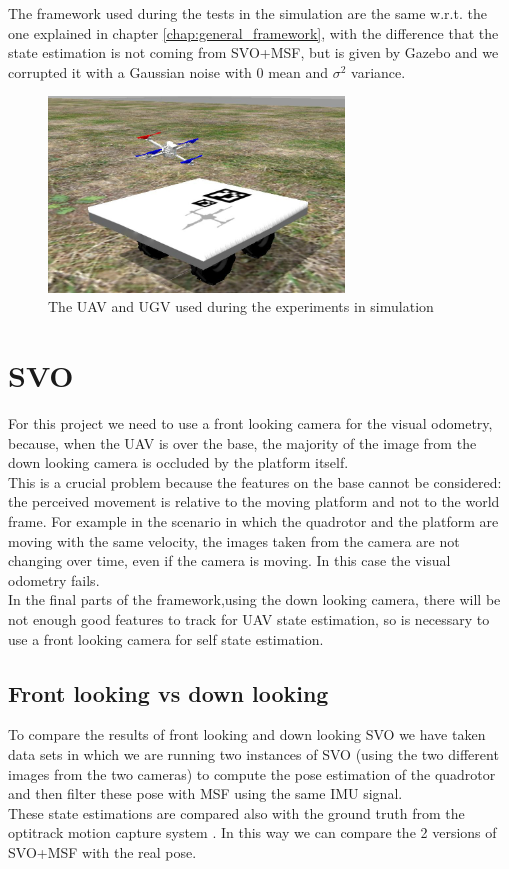 The framework used during the tests in the simulation are the same w.r.t. the one explained in chapter \ref{chap:general_framework}, with the difference that the state estimation is not coming from SVO+MSF, but is given by Gazebo and we corrupted it with a Gaussian noise with 0 mean and $\sigma^2$ variance.

\begin{figure}[!ht]
    \centering
    \includegraphics[width=0.7\textwidth]{img/simulation.jpg}
    \caption{The UAV and UGV used during the experiments in simulation}
    \label{fig:quad_ugv_sim}
\end{figure}

\section{SVO}
For this project we need to use a front looking camera for the visual odometry, because, when the UAV is over the base, the majority of the image from the down looking camera is occluded by the platform itself.\\
This is a crucial problem because the features on the base cannot be considered: the perceived movement is relative to the moving platform and not to the world frame. For example in the scenario in which the quadrotor and the platform are moving with the same velocity, the images taken from the camera are not changing over time, even if the camera is moving. In this case the visual odometry fails.\\
In the final parts of the framework,using the down looking camera, there will be not enough good features to track  for UAV state estimation, so is necessary to use a front looking camera for self state estimation.

\subsection{Front looking vs down looking}
To compare the results of front looking and down looking SVO we have taken data sets in which we are running two instances of SVO (using the two different images from the two cameras) to compute the pose estimation of the quadrotor and then filter these pose with MSF using the same IMU signal. \\
These state estimations are compared also with the ground truth from the optitrack motion capture system \cite{optitrack}. In this way we can compare the 2 versions of SVO+MSF with the real pose.\\

